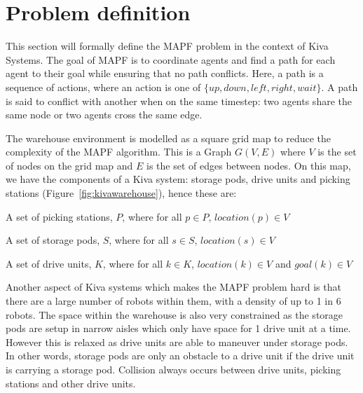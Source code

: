 \documentclass[a4paper,11pt]{article}
\begin{document}

%

\section{Problem definition} \label{sec:problemdef}
This section will formally define the MAPF problem in the context of Kiva Systems. The goal of MAPF is to coordinate agents and find a path for each agent to their goal while ensuring that no path conflicts. Here, a path is a sequence of actions, where an action is one of $\{up, down, left, right, wait\}$. A path is said to conflict with another when on the same timestep: two agents share the same node or two agents cross the same edge.

The warehouse environment is modelled as a square grid map to reduce the complexity of the MAPF algorithm. This is a  Graph $G(V, E)$ where $V$ is the set of nodes on the grid map and $E$ is the set of edges between nodes. On this map, we have the components of a Kiva system: storage pods, drive units and picking stations (Figure~\ref{fig:kivawarehouse}), hence these are:
\begin{compactitem}
	\item A set of picking stations, $P$, where for all $p \in P$, $location (p) \in V$
	\item A set of storage pods, $S$, where for all $s \in S$, $location (s) \in V$
	\item A set of drive units, $K$, where for all $k \in K$, $location(k) \in V$ and $goal(k) \in V$
\end{compactitem}

\noindent Another aspect of Kiva systems which makes the MAPF problem hard is that there are a large number of robots within them, with a density of up to 1 in 6 robots. The space within the warehouse is also very constrained as the storage pods are setup in narrow aisles which only have space for 1 drive unit at a time. However this is relaxed as drive units are able to maneuver under storage pods. In other words, storage pods are only an obstacle to a drive unit if the drive unit is carrying a storage pod. Collision always occurs between drive units, picking stations and other drive units.
\end{document}
